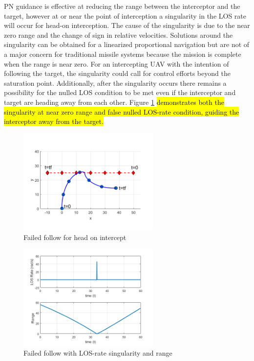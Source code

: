 \documentclass[conference]{IEEEtran}
\begin{document}
PN guidance is effective at reducing the range between the interceptor and the target, however at or near the point of interception a singularity in the LOS rate will occur for head-on interception. The cause of the singularity is due to the near zero range and the change of sign in relative velocities. Solutions around the singularity can be obtained for a linearized proportional navigation \cite{singularitySolution} but are not of a major concern for traditional missile systems because the mission is complete when the range is near zero. For an intercepting UAV with the intention of following the target, the singularity could call for control efforts beyond the saturation point. Additionally, after the singularity occurs there remains a possibility for the nulled LOS condition to be met even if the interceptor and target are heading away from each other. Figure \ref{fig:failedIntercept} \hl{demonstrates both the singularity at near zero range and false nulled LOS-rate condition, guiding the interceptor away from the target.}





\begin{figure}[H]
	\centering
	\includegraphics[width=7cm] {x50}
	\caption{Failed follow for head on intercept}
	\label{fig:failedIntercept}
	\hspace*{0mm}
\end{figure}


\begin{figure}[H]
	\centering
	\includegraphics[width=7cm] {x50_range_LOSrate}
	\caption{Failed follow with LOS-rate singularity and range}
	\label{fig:failedInterceptLOS}
	\hspace*{0mm}
\end{figure}
\end{document}
